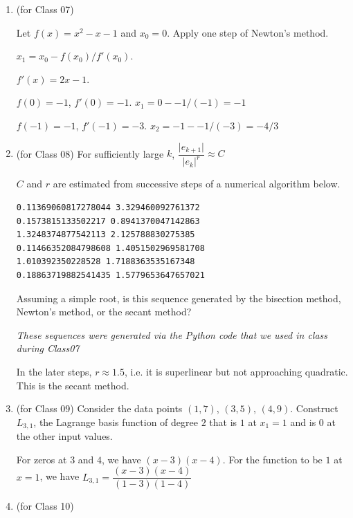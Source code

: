 \documentclass[12pt,letterpaper,answers]{exam}
\begin{document}
\begin{enumerate}
\item (for Class 07)

Let $f(x) = x^2 -x -1$ and $x_0 = 0$.  Apply one step of Newton's method.

\begin{solution}
$x_1 = x_0 - f(x_0)/f'(x_0)$.  

$f'(x) = 2x - 1$.

$f(0) = -1$, $f'(0) = -1$.  $x_1 = 0 - -1/(-1) = -1$

$f(-1) = -1$, $f'(-1) = -3$.  $x_2 = -1 - -1/(-3) = -4/3$
\end{solution}

\item (for Class 08) For sufficiently large $k$, $\dfrac{\vert e_{k+1}\vert}{\vert e_k\vert^r} \approx C$


$C$ and $r$ are estimated from successive steps of a numerical algorithm below.

\begin{verbatim}
0.11369060817278044 3.329460092761372
0.1573815133502217 0.8941370047142863
1.3248374877542113 2.125788830275385
0.11466352084798608 1.4051502969581708
1.010392350228528 1.7188363535167348
0.18863719882541435 1.5779653647657021
\end{verbatim}

Assuming a simple root, is this sequence generated by the bisection method, Newton's method, or the secant method?

\emph{These sequences were generated via the Python code that we used in class during Class07}

\begin{solution}
In the later steps, $r\approx 1.5$, i.e. it is superlinear but not approaching quadratic.  This is the secant method.
\end{solution}

\item (for Class 09)
Consider the data points $(1,7)$, $(3, 5)$, $(4, 9)$.  Construct $L_{3,1}$, the Lagrange basis function of degree $2$ that is $1$ at $x_1 = 1$ and is $0$ at the other input values.

\begin{solution}
For zeros at $3$ and $4$, we have $(x-3)(x-4)$.  For the function to be $1$ at $x = 1$, we have $L_{3,1} = \dfrac{(x-3)(x-4)}{(1-3)(1-4)}$

\end{solution}

\item (for Class 10)


\end{enumerate}
\end{document}
